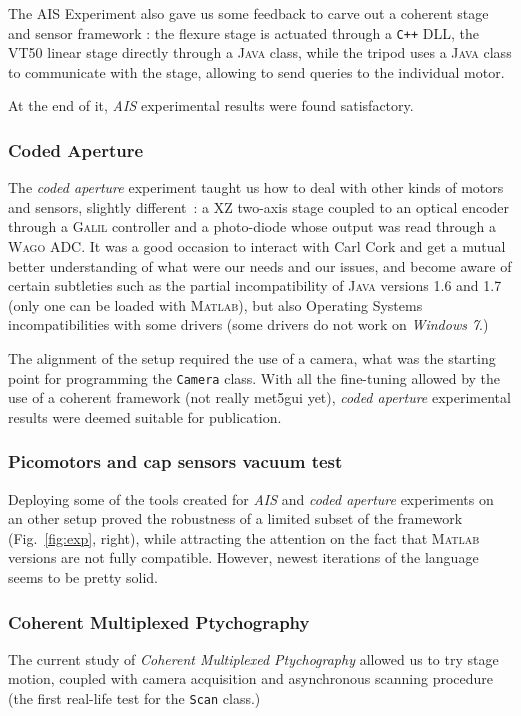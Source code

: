 \documentclass[10pt,letter,twoside]{report}
\begin{document}
The AIS Experiment also gave us some feedback to carve out a coherent stage and sensor framework : the flexure stage is actuated through a \verb!C++! DLL, the VT50 linear stage directly through a \textsc{Java} class, while the tripod uses a \textsc{Java} class to communicate with the stage, allowing to send queries to the individual motor.

At the end of it, \emph{AIS} experimental results were found satisfactory.

\subsubsection{Coded Aperture}
The \emph{coded aperture} experiment taught us how to deal with other kinds of motors and sensors, slightly different~: a XZ two-axis stage coupled to an optical encoder through a \textsc{Galil} controller and a photo-diode whose output was read through a \textsc{Wago} ADC.
It was a good occasion to interact with Carl Cork and get a mutual better understanding of what were our needs and our issues, and become aware of certain subtleties such as the partial incompatibility of \textsc{Java} versions 1.6 and 1.7 (only one can be loaded with \textsc{Matlab}), but also Operating Systems incompatibilities with some drivers (some drivers do not work on \textit{Windows 7}.)

The alignment of the setup required the use of a camera, what was the starting point for programming the \verb!Camera! class.
With all the fine-tuning allowed by the use of a coherent framework (not really met5gui yet), \emph{coded aperture} experimental results were deemed suitable for publication.

\subsubsection{Picomotors and cap sensors vacuum test}
Deploying some of the tools created for \emph{AIS} and \emph{coded aperture} experiments on an other setup proved the robustness of a limited subset of the framework (Fig.~\ref{fig:exp}, right), while attracting the attention on the fact that \textsc{Matlab} versions are not fully compatible. 
However, newest iterations of the language seems to be pretty solid.

\subsubsection{Coherent Multiplexed Ptychography}
The current study of \emph{Coherent Multiplexed Ptychography} allowed us to try stage motion, coupled with camera acquisition and asynchronous scanning procedure (the first real-life test for the \verb!Scan! class.)
\end{document}
